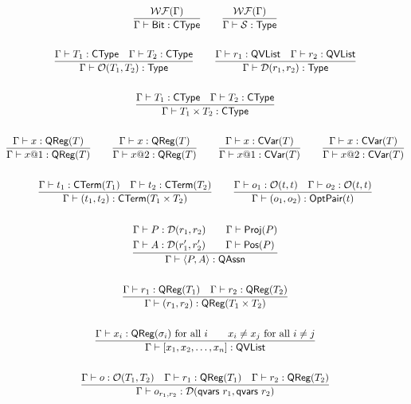 \begin{gather*}
    \frac{\mathcal{WF}(\Gamma)}{\Gamma \vdash \textsf{Bit} : \textsf{CType}}
    \qquad
    \frac{\mathcal{WF}(\Gamma)}{\Gamma \vdash \mathcal{S} : \textsf{Type}} \\
    \\
    \frac{\Gamma \vdash T_1 : \textsf{CType} \quad \Gamma \vdash T_2 : \textsf{CType}}{\Gamma \vdash \mathcal{O}(T_1, T_2) : \textsf{Type}}
    \qquad
    \frac{\Gamma \vdash r_1 : \textsf{QVList} \quad \Gamma \vdash r_2 : \textsf{QVList}}{\Gamma \vdash \mathcal{D}(r_1, r_2) : \textsf{Type}} \\
    \\
    \frac{\Gamma \vdash T_1 : \textsf{CType} \quad \Gamma \vdash T_2 : \textsf{CType}}{\Gamma \vdash T_1 \times T_2 : \textsf{CType}} \\
    \\
    \frac{\Gamma \vdash x : \textsf{QReg}(T)}{\Gamma \vdash x@1 : \textsf{QReg}(T)}
    \qquad
    \frac{\Gamma \vdash x : \textsf{QReg}(T)}{\Gamma \vdash x@2 : \textsf{QReg}(T)}
    \qquad
    \frac{\Gamma \vdash x : \textsf{CVar}(T)}{\Gamma \vdash x@1 : \textsf{CVar}(T)}
    \qquad
    \frac{\Gamma \vdash x : \textsf{CVar}(T)}{\Gamma \vdash x@2 : \textsf{CVar}(T)}
    \\
    \\
    \frac{
    \Gamma \vdash t_1 : \textsf{CTerm}(T_1) \quad \Gamma \vdash t_2 : \textsf{CTerm}(T_2)
    }
    {\Gamma \vdash (t_1, t_2) : \textsf{CTerm}(T_1 \times T_2)}
    \qquad
    \frac{\Gamma \vdash o_1 : \mathcal{O}(t, t) \quad \Gamma \vdash o_2 : \mathcal{O}(t, t)}{\Gamma \vdash (o_1, o_2) : \textsf{OptPair}(t)} \\
    \\
    \frac{
        \begin{aligned}
            & \Gamma \vdash P : \mathcal{D}(r_1, r_2) \qquad \Gamma \vdash \textsf{Proj}({P}) \\
            & \Gamma \vdash A : \mathcal{D}(r_1', r_2') \qquad \Gamma \vdash \textsf{Pos}({P})
        \end{aligned}
    }{\Gamma \vdash \langle P, A \rangle : \textsf{QAssn}} \\
    \\
    \frac{\Gamma \vdash r_1 : \textsf{QReg}(T_1) \quad \Gamma \vdash r_2 : \textsf{QReg}(T_2)}{\Gamma \vdash (r_1, r_2) : \textsf{QReg}(T_1 \times T_2)}
    \\
    \\
    \frac{\Gamma \vdash x_i : \textsf{QReg}(\sigma_i) \text{ for all } i \qquad x_i \neq x_j \text{ for all } i \neq j}{\Gamma \vdash [x_1, x_2, \dots, x_n] : \textsf{QVList}} \\
    \\
    \frac{\Gamma \vdash o : \mathcal{O}(T_1, T_2) \quad \Gamma \vdash r_1 : \textsf{QReg}(T_1) \quad \Gamma \vdash r_2 : \textsf{QReg}(T_2)}{\Gamma \vdash o_{r_1,r_2} : \mathcal{D}(\textsf{qvars}\ r_1, \textsf{qvars}\ r_2)}
\end{gather*}

